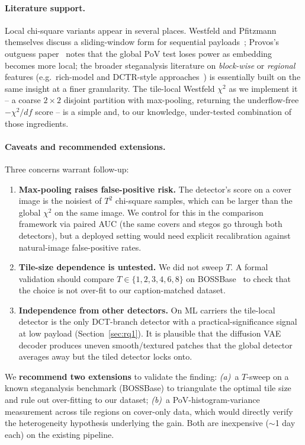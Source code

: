 \documentclass[10pt,twocolumn,a4paper]{article}
\begin{document}
\paragraph{Literature support.} Local chi-square variants appear in several places. Westfeld and Pfitzmann themselves discuss a sliding-window form for sequential payloads~\cite{westfeld1999chi}; Provos's outguess paper~\cite{provos2001outguess} notes that the global PoV test loses power as embedding becomes more local; the broader steganalysis literature on \emph{block-wise} or \emph{regional} features (e.g.\ rich-model and DCTR-style approaches~\cite{fridrich2012srm,holub2015dctr}) is essentially built on the same insight at a finer granularity. The tile-local Westfeld $\chi^2$ as we implement it -- a coarse $2\!\times\!2$ disjoint partition with max-pooling, returning the underflow-free $-\chi^2/df$ score -- is a simple and, to our knowledge, under-tested combination of those ingredients.

\paragraph{Caveats and recommended extensions.} Three concerns warrant follow-up:
\begin{enumerate}
\item \textbf{Max-pooling raises false-positive risk.} The detector's score on a cover image is the noisiest of $T^2$ chi-square samples, which can be larger than the global $\chi^2$ on the same image. We control for this in the comparison framework via paired AUC (the same covers and stegos go through both detectors), but a deployed setting would need explicit recalibration against natural-image false-positive rates.
\item \textbf{Tile-size dependence is untested.} We did not sweep $T$. A formal validation should compare $T\!\in\!\{1,2,3,4,6,8\}$ on BOSSBase~\cite{bas2011boss} to check that the choice is not over-fit to our caption-matched dataset.
\item \textbf{Independence from other detectors.} On ML carriers the tile-local detector is the only DCT-branch detector with a practical-significance signal at low payload (Section~\ref{sec:rq1}). It is plausible that the diffusion VAE decoder produces uneven smooth/textured patches that the global detector averages away but the tiled detector locks onto.
\end{enumerate}

We \textbf{recommend two extensions} to validate the finding:
\textit{(a)}~a $T$-sweep on a known steganalysis benchmark (BOSSBase) to triangulate the optimal tile size and rule out over-fitting to our dataset;
\textit{(b)}~a PoV-histogram-variance measurement across tile regions on cover-only data, which would directly verify the heterogeneity hypothesis underlying the gain. Both are inexpensive ($\sim$1 day each) on the existing pipeline.
\end{document}
